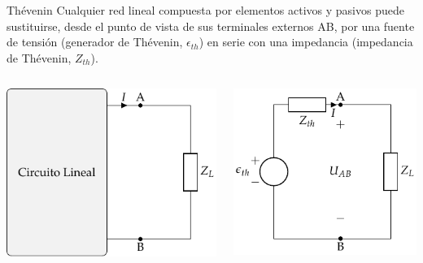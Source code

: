 \documentclass[aspectratio=169, usenames,svgnames,dvipsnames]{beamer}
\begin{document}
\begin{frame}[label={sec:orgaadeb2d}]{Thévenin}
Cualquier \alert{red lineal} compuesta por elementos activos y pasivos puede sustituirse, desde el punto de vista de sus terminales externos AB, por una \alert{fuente de tensión} (generador de Thévenin, \(\epsilon_{th}\)) en \alert{serie} con una impedancia (impedancia de Thévenin, \(Z_{th}\)).

\begin{columns}
\begin{column}{0.5\columnwidth}
\begin{center}
\includegraphics[height=0.6\textheight]{../figs/CircuitoLineal_ZL.pdf}
\end{center}
\end{column}

\begin{column}{0.5\columnwidth}
\begin{center}
\includegraphics[height=0.6\textheight]{../figs/EquivalenteThevenin.pdf}
\end{center}
\end{column}
\end{columns}
\end{frame}
\end{document}
